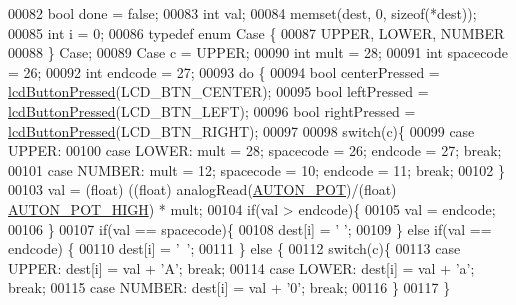\begin{DoxyCode}
00082     \textcolor{keywordtype}{bool} done = \textcolor{keyword}{false};
00083     \textcolor{keywordtype}{int} val;
00084     memset(dest, 0, \textcolor{keyword}{sizeof}(*dest));
00085     \textcolor{keywordtype}{int} i = 0;
00086     \textcolor{keyword}{typedef} \textcolor{keyword}{enum} Case \{
00087         UPPER, LOWER, NUMBER
00088     \} Case;
00089     Case c = UPPER;
00090     \textcolor{keywordtype}{int} mult = 28;
00091     \textcolor{keywordtype}{int} spacecode = 26;
00092     \textcolor{keywordtype}{int} endcode = 27;
00093     \textcolor{keywordflow}{do} \{
00094         \textcolor{keywordtype}{bool} centerPressed = \hyperlink{lcddiag_8h_a74e4c744db49f9b7b645095575e152ad}{lcdButtonPressed}(LCD\_BTN\_CENTER);
00095         \textcolor{keywordtype}{bool} leftPressed = \hyperlink{lcddiag_8h_a74e4c744db49f9b7b645095575e152ad}{lcdButtonPressed}(LCD\_BTN\_LEFT);
00096         \textcolor{keywordtype}{bool} rightPressed = \hyperlink{lcddiag_8h_a74e4c744db49f9b7b645095575e152ad}{lcdButtonPressed}(LCD\_BTN\_RIGHT);
00097 
00098         \textcolor{keywordflow}{switch}(c)\{
00099             \textcolor{keywordflow}{case} UPPER:
00100             \textcolor{keywordflow}{case} LOWER: mult = 28; spacecode = 26; endcode = 27; \textcolor{keywordflow}{break};
00101             \textcolor{keywordflow}{case} NUMBER: mult = 12; spacecode = 10; endcode = 11; \textcolor{keywordflow}{break};
00102         \}
00103         val = (float) ((\textcolor{keywordtype}{float}) analogRead(\hyperlink{autonrecorder_8h_a2490cda7a399f481333af2e5589b74a9}{AUTON\_POT})/(float) 
      \hyperlink{autonrecorder_8h_a01989d89b8bed150d0aacdaef5ccabd3}{AUTON\_POT\_HIGH}) * mult;
00104         \textcolor{keywordflow}{if}(val > endcode)\{
00105             val = endcode;
00106         \}
00107         \textcolor{keywordflow}{if}(val == spacecode)\{
00108             dest[i] = \textcolor{charliteral}{' '};
00109         \} \textcolor{keywordflow}{else} \textcolor{keywordflow}{if}(val == endcode) \{
00110             dest[i] = \textcolor{charliteral}{'~'};
00111         \} \textcolor{keywordflow}{else} \{
00112             \textcolor{keywordflow}{switch}(c)\{
00113                 \textcolor{keywordflow}{case} UPPER: dest[i] = val + \textcolor{charliteral}{'A'}; \textcolor{keywordflow}{break};
00114                 \textcolor{keywordflow}{case} LOWER: dest[i] = val + \textcolor{charliteral}{'a'}; \textcolor{keywordflow}{break};
00115                 \textcolor{keywordflow}{case} NUMBER: dest[i] = val + \textcolor{charliteral}{'0'}; \textcolor{keywordflow}{break};
00116             \}
00117         \}

\end{DoxyCode}
